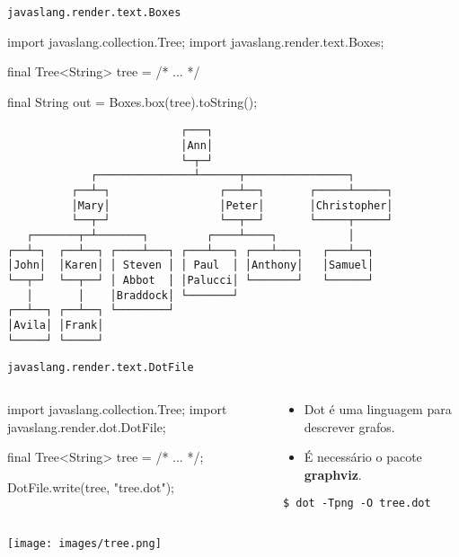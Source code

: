\documentclass[smaller]{beamer}
\begin{document}
\begin{frame}{\texttt{javaslang.render.text.Boxes}}
  \footnotesize
\begin{pygmented}[]
import javaslang.collection.Tree;
import javaslang.render.text.Boxes;

final Tree<String> tree = /* ... */

final String out = Boxes.box(tree).toString();
\end{pygmented}

\begin{verbatim}
                           ┌───┐                            
                           │Ann│                            
                           └─┬─┘                            
             ┌───────────────┴──────┬────────────────┐      
          ┌──┴─┐                 ┌──┴──┐       ┌─────┴─────┐
          │Mary│                 │Peter│       │Christopher│
          └──┬─┘                 └──┬──┘       └─────┬─────┘
   ┌───────┬─┴───────┐         ┌────┴────┐           │      
┌──┴─┐  ┌──┴──┐ ┌────┴───┐ ┌───┴───┐ ┌───┴───┐   ┌───┴──┐   
│John│  │Karen│ │ Steven │ │ Paul  │ │Anthony│   │Samuel│   
└──┬─┘  └──┬──┘ │ Abbot  │ │Palucci│ └───────┘   └──────┘   
   │       │    │Braddock│ └───────┘                        
┌──┴──┐ ┌──┴──┐ └────────┘                                  
│Avila│ │Frank│                                             
└─────┘ └─────┘                                             
\end{verbatim}
\end{frame}


\begin{frame}{\texttt{javaslang.render.text.DotFile}}
  \small
  \begin{columns}[t]
    \begin{column}{.5\textwidth}
\begin{pygmented}[]
import javaslang.collection.Tree;
import javaslang.render.dot.DotFile;

final Tree<String> tree = /* ... */;

DotFile.write(tree, "tree.dot");
\end{pygmented}
    \end{column}
    \begin{column}{.5\textwidth}
      \begin{itemize}
        \item Dot é uma linguagem para descrever grafos.
        \item É necessário o pacote \textbf{graphviz}.
      \end{itemize}
\begin{Verbatim}[frame=single]
$ dot -Tpng -O tree.dot
\end{Verbatim}
    \end{column}
  \end{columns}
  \begin{center}
    \texttt{[image: images/tree.png]}
  \end{center}
\end{frame}
\end{document}
